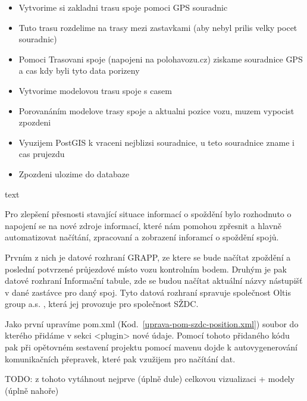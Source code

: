 \begin{itemize}
	\item Vytvorime si zakladni trasu spoje pomoci GPS souradnic
	\item Tuto trasu rozdelime na trasy mezi zastavkami (aby nebyl prilis velky pocet souradnic)
	\item Pomoci Trasovani spoje (napojeni na polohavozu.cz) ziskame souradnice GPS a cas kdy byli tyto data porizeny
	\item Vytvorime modelovou trasu spoje s casem
	\item Porovanáním modelove trasy spoje a aktualni pozice vozu, muzem vypocist zpozdeni
	\item Vyuzijem PostGIS k vraceni nejblizsi souradnice, u teto souradnice zname i cas prujezdu
	\item Zpozdeni ulozime do databaze
\end{itemize}

text


Pro zlepšení přesnosti stavající situace informací o spoždění bylo rozhodnuto o napojení se na nové zdroje informací, které nám pomohou zpřesnit a hlavně automatizovat načítání, zpracovaní a zobrazení inforamcí o spoždění spojů.

Prvním z nich je datové rozhraní GRAPP, ze ktere se bude načítat zpoždění a poslední potvrzené průjezdové místo vozu kontrolním bodem. Druhým je pak datové rozhraní Informační tabule, zde se budou načítat aktuální názvy nástupišť v dané zastávce pro daný spoj. Tyto datová rozhraní spravuje společnost Oltis group a.s. , která jej provozuje pro společnost SŽDC.
 
Jako první upravíme pom.xml (Kod.~\ref{uprava-pom-szdc-position.xml}) soubor do kterého přidáme v sekci <plugin> nové údaje. Pomocí tohoto přidaného kódu pak při opětovném sestavení projektu pomocí mavenu dojde k autovygenerování komunikačních přepravek, které pak vzužijem pro načítání dat.
 

TODO: z tohoto vytáhnout nejprve (úplně dule) celkovou vizualizaci + modely (úplně nahoře)

